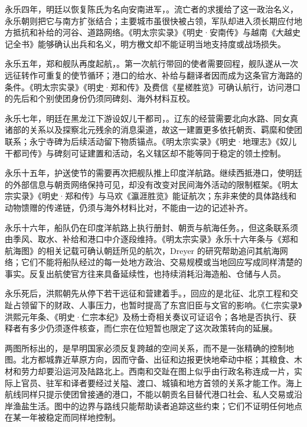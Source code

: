 永乐四年，明廷以恢复陈氏为名向安南进军，。流亡者的求援给了这一政治名义，永乐朝则把它与南方扩张结合；主要城市虽很快被占领，军队却进入须长期应付地方抵抗和补给的河谷、道路网络。《明太宗实录》《明史·安南传》与越南《大越史记全书》能够确认出兵和名义，明方檄文却不能证明当地支持度或战场损失。

永乐五年，郑和舰队再度起航，。第一次航行带回的使者需要回程，舰队遂从一次远征转作可重复的使节循环；港口的给水、补给与翻译者因而成为这条官方海路的条件。《明太宗实录》《明史·郑和传》及费信《星槎胜览》可确认航行，访问港口的先后和个别使团身份仍须同碑刻、海外材料互校。

永乐七年，明廷在黑龙江下游设奴儿干都司，。辽东的经营需要北向水路、同女真诸部的关系以及探察北元残余的消息渠道，故这一建置更多依托朝贡、羁縻和使团联系；永宁寺碑为后续活动留下物质锚点。《明太宗实录》《明史·地理志》《奴儿干都司传》与碑刻可证建置和活动，名义辖区却不能等同于稳定的领土控制。

永乐十五年，护送使节的需要再次把舰队推上印度洋航路。继续西抵港口，使明廷的外部信息与朝贡网络保持可见，却没有改变对民间海外活动的限制框架。《明太宗实录》《明史·郑和传》与马欢《瀛涯胜览》能证航次；东非来使的具体路线和动物馈赠的传递链，仍须与海外材料比对，不能由一边的记述补齐。

永乐十六年，船队仍在印度洋航路上执行册封、朝贡与航海任务。，但这条联系须由季风、取水、补给和港口中介逐段维持。《明太宗实录》永乐十六年条与《郑和航海图》的相关记载可确认朝廷所见的航次，Dreyer 的研究帮助追问其航海网络；它们不能将船队经过的每一处地方政治、交易规模或当地回应写成同样清楚的事实。反复出航使官方往来具备延续性，也持续消耗沿海造船、仓储与人员。

永乐死后，洪熙朝先从停下若干远征和营建着手。，回应的是北征、北京工程和交趾占领留下的财政、人事压力，也暂时提高了东宫旧臣与文官的影响。《仁宗实录》洪熙元年条、《明史·仁宗本纪》及杨士奇相关奏议可证诏令；各地是否执行、获释者有多少仍须逐件核查，而仁宗在位短暂也限定了这次政策转向的延展。




两图所标出的，是早明国家必须反复跨越的空间关系，而不是一张精确的控制地图。北方都城靠近草原方向，因而守备、出征和边报更快地牵动中枢；其粮食、木材和劳力却要沿运河及陆路北上。西南和交趾在图上似乎由行政名称连成一片，实际上官员、驻军和译者要经过关隘、渡口、城镇和地方首领的关系才能工作。海上航线同样只提示使团曾接通的港口，不能以朝贡名目替代港口社会、私人交易或沿岸渔盐生活。图中的边界与路线只能帮助读者追踪这些约束；它们不证明任何地点在某一年被稳定而同样地控制。

